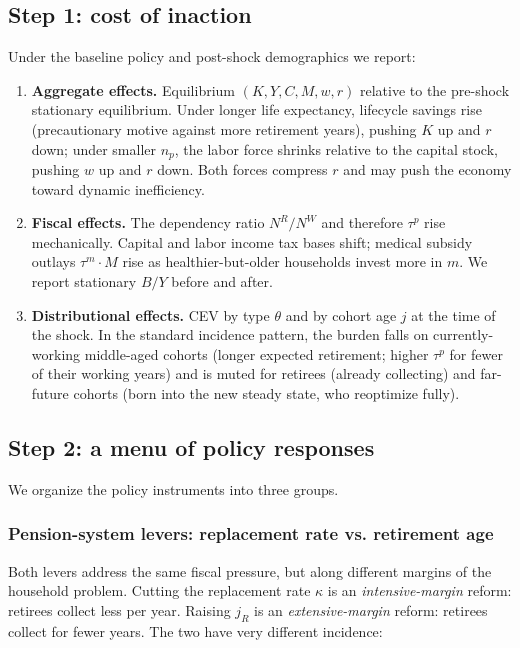 \documentclass[12pt,a4paper]{article}
\begin{document}
\subsection{Step 1: cost of inaction}
\label{subsec:policy_step1}

Under the baseline policy and post-shock demographics we report:
\begin{enumerate}
\item \textbf{Aggregate effects.} Equilibrium $(K, Y, C, M, w, r)$ relative to the pre-shock stationary equilibrium. Under longer life expectancy, lifecycle savings rise (precautionary motive against more retirement years), pushing $K$ up and $r$ down; under smaller $n_p$, the labor force shrinks relative to the capital stock, pushing $w$ up and $r$ down. Both forces compress $r$ and may push the economy toward dynamic inefficiency.
\item \textbf{Fiscal effects.} The dependency ratio $N^R/N^W$ and therefore $\tau^p$ rise mechanically. Capital and labor income tax bases shift; medical subsidy outlays $\tau^m \cdot M$ rise as healthier-but-older households invest more in $m$. We report stationary $B/Y$ before and after.
\item \textbf{Distributional effects.} CEV by type $\theta$ and by cohort age $j$ at the time of the shock. In the standard incidence pattern, the burden falls on currently-working middle-aged cohorts (longer expected retirement; higher $\tau^p$ for fewer of their working years) and is muted for retirees (already collecting) and far-future cohorts (born into the new steady state, who reoptimize fully).
\end{enumerate}
\subsection{Step 2: a menu of policy responses}
\label{subsec:policy_step2}
We organize the policy instruments into three groups.
 
\subsubsection{Pension-system levers: replacement rate vs. retirement age}
 
Both levers address the same fiscal pressure, but along different margins of the household problem. Cutting the replacement rate $\kappa$ is an \emph{intensive-margin} reform: retirees collect less per year. Raising $j_R$ is an \emph{extensive-margin} reform: retirees collect for fewer years. The two have very different incidence:
 
\end{document}
